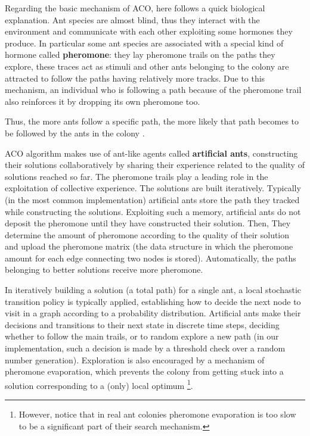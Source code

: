 \documentclass[10pt]{article}
\begin{document}
Regarding the basic mechanism of ACO, here follows a quick biological explanation.
Ant species are almost blind, thus they interact with the environment and communicate with each  other  exploiting some hormones they produce.  
In particular some  ant species are associated with a special kind of hormone called \textbf{pheromone}: they lay pheromone trails on the paths they explore, these traces act as stimuli and other ants belonging to the colony are attracted to follow the paths having relatively more tracks.  
Due to this mechanism, an individual who is following a  path  because of the  pheromone  trail also reinforces  it  by dropping its own pheromone too.  

Thus, the  more ants  follow  a  specific  path,  the  more  likely  that  path  becomes  to  be  followed  by  the  ants  in the colony \cite{ cinque,otto, nove}.  

ACO  algorithm  makes use  of ant-like agents called \textbf{artificial ants}, constructing their solutions collaboratively by sharing their experience related to the quality of solutions reached so far.
The pheromone trails play  a  leading  role  in  the  exploitation of collective experience.
The solutions are built iteratively.
Typically (in the most common implementation) artificial  ants  store  the  path  they  tracked while  constructing  the solutions.  
Exploiting such a memory, artificial  ants  do not deposit  the pheromone until they have constructed their solution. 
Then, They determine the amount of pheromone according  to  the  quality  of  their  solution  and upload the pheromone matrix (the data structure in which the pheromone amount for each edge connecting two nodes is stored). 
Automatically, the paths belonging to better solutions receive  more pheromone.

In iteratively building a solution (a total path) for a single ant, a local stochastic  transition policy is typically applied, establishing how to decide the next node to visit in a graph according to a probability distribution. Artificial  ants  make  their  decisions  and  transitions  to  their  next  state  in  discrete  time steps, deciding whether to follow the main trails, or to random explore a new path (in our implementation, such a decision is made by a threshold check over a random number generation).
Exploration is also encouraged  by a mechanism of  pheromone  evaporation, which prevents the  colony from  getting stuck into a solution corresponding to a (only) local optimum \footnote{However, notice that in real ant colonies pheromone evaporation is too slow to be a significant part of their search mechanism.}.
\end{document}
